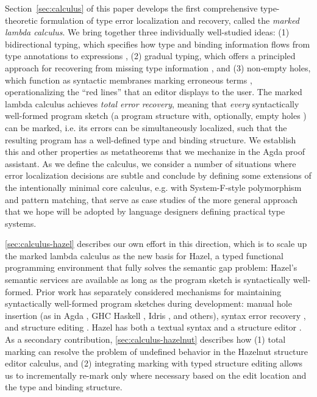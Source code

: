 Section~\ref{sec:calculus} of this paper develops the first comprehensive {type-theoretic formulation} of type error localization and recovery, called the \emph{marked lambda calculus}.
We bring together three individually well-studied ideas: (1) bidirectional typing, which specifies how type and binding information flows from 
type annotations to expressions \cite{Localinf,BidirTyping}, (2) gradual typing, which offers a principled approach for recovering from missing type information \cite{Siek06a,siek2015refined}, and 
(3) non-empty holes, which function as syntactic membranes marking erroneous terms \cite{HazelnutPOPL}, operationalizing the ``red lines'' that an editor displays to the user.
The marked lambda calculus achieves \emph{total error recovery}, meaning that \emph{every} syntactically well-formed program sketch (a program structure with, optionally, empty holes \cite{solar2013program}) can be marked, i.e. its errors can be simultaneously localized, such that the resulting program has a well-defined type and binding structure.
We establish this and other properties as metatheorems that we mechanize in the Agda proof assistant. 
As we define the calculus, we consider a number of situations where error localization decisions are subtle and conclude by defining some extensions of the intentionally minimal core calculus, e.g. with System-F-style polymorphism and pattern matching, 
that serve as case studies of the more general approach that we hope will be adopted by language designers defining practical type systems.

\cref{sec:calculus-hazel} describes our own effort in this direction, which is to scale up the marked lambda calculus as the new basis for Hazel, a typed functional programming environment that fully solves the semantic gap problem: Hazel's semantic services are available as long as the program sketch is syntactically well-formed. Prior work has separately considered mechanisms for maintaining syntactically well-formed program sketches during development: manual hole insertion (as in Agda \cite{norell:thesis}, GHC Haskell \cite{haskell-holes}, Idris \cite{DBLP:journals/jfp/Brady13}, and others), syntax error recovery \cite{medeiros20,sorkin11}, and structure editing \cite{HazelnutPOPL,teitelbaum_cornell_1981}. 
Hazel has both a textual syntax and a structure editor \cite{HazelnutPOPL,DBLP:conf/vl/Moon023}. 
As a secondary contribution, 
\cref{sec:calculus-hazelnut} describes how (1)  total marking can resolve the problem of undefined behavior in the Hazelnut structure editor calculus, 
and (2) integrating marking with typed structure editing allows us to incrementally re-mark only where necessary based on the edit location and the type and binding structure.


